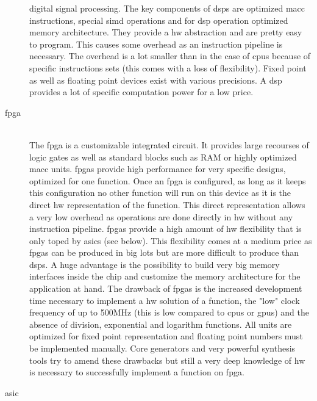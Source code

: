 \documentclass[mscthesis]{usiinfthesis}
\begin{document}
\begin{description}
        digital signal processing. The key components of \glspl{dsp} are
        optimized \gls{macc} instructions, special \gls{simd}
        operations and for \gls{dsp} operation optimized memory architecture.
        They provide a \gls{hw} abstraction and are pretty easy to program.
        This causes some overhead as an instruction pipeline is necessary. The
        overhead is a lot smaller than in the case of \glspl{cpu} because of
        specific instructions sets (this comes with a loss of flexibility).
        Fixed point as well as floating point devices exist with various
        precisions. A \gls{dsp} provides a lot of specific computation power
        for a low price.
    \item[\acrshort{fpga}] \hfill \\
        The \acrfull{fpga} is a customizable integrated circuit. It provides
        large recourses of logic gates as well as standard blocks such as RAM
        or highly optimized \gls{macc} units. \glspl{fpga} provide
        high performance for very specific designs, optimized for one function.
        Once an \gls{fpga} is configured, as long as it keeps this
        configuration no other function will run on this device as it is the
        direct \gls{hw} representation of the function. This direct
        representation allows a very low overhead as operations are done
        directly in \gls{hw} without any instruction pipeline. \glspl{fpga}
        provide a high amount of \gls{hw} flexibility that is only toped by
        \glspl{asic} (see below). This flexibility comes at a medium price as
        \glspl{fpga} can be produced in big lots but are more difficult to
        produce than \glspl{dsp}. A huge advantage is the possibility to
        build very big memory interfaces inside the chip and customize the
        memory architecture for the application at hand. The drawback of
        \glspl{fpga} is the increased development time necessary to implement
        a \gls{hw} solution of a function, the "low" clock frequency of up to
        500MHz (this is low compared to \glspl{cpu} or \glspl{gpu}) and the
        absence of division, exponential and logarithm functions. All units are
        optimized for fixed point representation and floating point numbers
        must be implemented manually. Core generators and very powerful
        synthesis tools try to amend these drawbacks but still a very deep
        knowledge of \gls{hw} is necessary to successfully implement a function
        on \gls{fpga}.
    \item[\acrshort{asic}] \hfill \\

\end{description}
\end{document}
